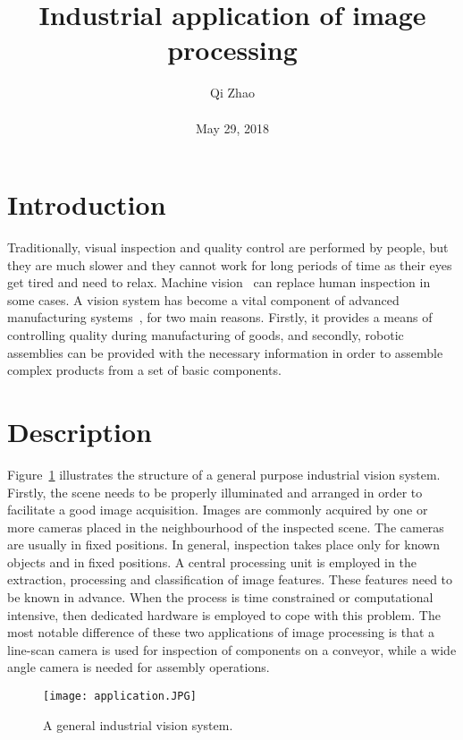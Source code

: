 \documentclass[10pt,twocolumn,letterpaper]{article}
\begin{document}
\title{Industrial application of image processing}
\author{Qi Zhao\\\\May 29, 2018}

\maketitle
\section{Introduction}
 Traditionally, visual inspection and quality control are performed by people, but they are much slower and they cannot work for long periods of time as their eyes get tired and need to relax. Machine vision~\cite{sonka2014image} can replace human inspection in some cases. A vision system has become a vital component of advanced manufacturing systems~\cite{mehrabi2000reconfigurable}, for two main reasons. Firstly, it provides a means of controlling quality during manufacturing of goods, and secondly, robotic assemblies can be provided with the necessary information in order to assemble complex products from a set of basic components.
\section{Description}
 Figure~\ref{fig:onecol} illustrates the structure of a general purpose industrial vision system. Firstly, the scene needs to be properly illuminated and arranged in order to facilitate a good image acquisition. Images are commonly acquired by one or more cameras placed in the neighbourhood of the inspected scene. The cameras are usually in fixed positions. In general, inspection takes place only for known objects and in fixed positions. A central processing unit is employed in the extraction, processing and classification of image features. These features need to be known in advance. When the process is time constrained or computational intensive, then dedicated hardware is employed to cope with this problem. The most notable difference of these two applications of image processing is that a line-scan camera is used for inspection of components on a conveyor, while a wide angle camera is needed for assembly operations.


\begin{figure}[t]
\begin{center}

\texttt{[image: application.JPG]}
\end{center}
 \caption{A general industrial vision system.}
\label{fig:long}
\label{fig:onecol}
\end{figure}
\end{document}
